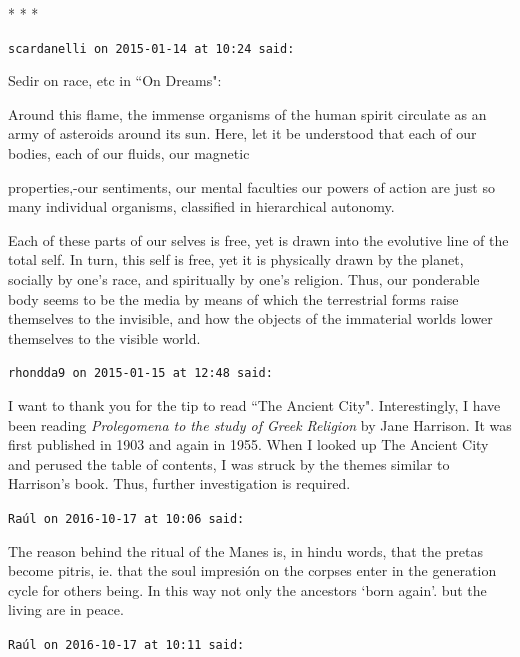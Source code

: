 
\begin{center}* * *\end{center}

\begin{footnotesize}\begin{sffamily}



\texttt{scardanelli on 2015-01-14 at 10:24 said: }

Sedir on race, etc in ``On Dreams":

Around this flame, the immense organisms of the human spirit circulate as an army of asteroids around its sun. Here, let it be understood that each of our bodies, each of our fluids, our magnetic

properties,-our sentiments, our mental faculties our powers of action are just so many individual organisms, classified in hierarchical autonomy.

Each of these parts of our selves is free, yet is drawn into the evolutive line of the total self. In turn, this self is free, yet it is physically drawn by the planet, socially by one's race, and spiritually by one's religion. Thus, our ponderable body seems to be the media by means of which the terrestrial forms raise themselves to the invisible, and how the objects of the immaterial worlds lower themselves to the visible world.


\hfill

\texttt{rhondda9 on 2015-01-15 at 12:48 said: }

I want to thank you for the tip to read ``The Ancient City". Interestingly, I have been reading \textit{Prolegomena to the study of Greek Religion} by Jane Harrison. It was first published in 1903 and again in 1955. When I looked up The Ancient City and perused the table of contents, I was struck by the themes similar to Harrison's book. Thus, further investigation is required.


\hfill

\texttt{Raúl on 2016-10-17 at 10:06 said: }

The reason behind the ritual of the Manes is, in hindu words, that the pretas become pitris, ie. that the soul impresión on the corpses enter in the generation cycle for others being. In this way not only the ancestors `born again'. but the living are in peace.


\hfill

\texttt{Raúl on 2016-10-17 at 10:11 said: }


\end{sffamily}
\end{footnotesize}
